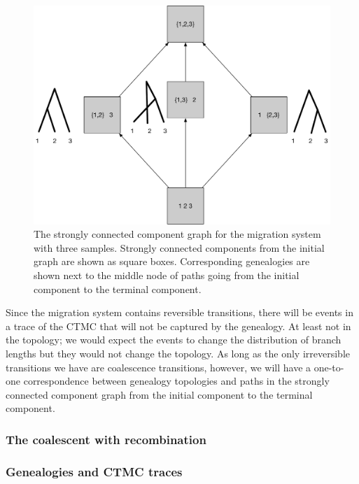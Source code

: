 \documentclass[graybox]{svmult}
\begin{document}
\begin{figure}[h]
\sidecaption
\includegraphics[scale=.20]{figures/migration-SCC-graph}
\caption{The strongly connected component graph for the migration system with three samples. Strongly connected components from the initial graph are shown as square boxes. Corresponding genealogies are shown next to the middle node of paths going from the initial component to the terminal component.}
\label{fig:migration-SCC-graph}
\end{figure}

Since the migration system contains reversible transitions, there will be events in a trace of the CTMC that will not be captured by the genealogy. At least not in the topology; we would expect the events to change the distribution of branch lengths but they would not change the topology. As long as the only irreversible transitions we have are coalescence transitions, however, we will have a one-to-one correspondence between genealogy topologies and paths in the strongly connected component graph from the initial component to the terminal component.


\subsubsection{The coalescent with recombination}





\subsubsection{Genealogies and CTMC traces}
\end{document}
